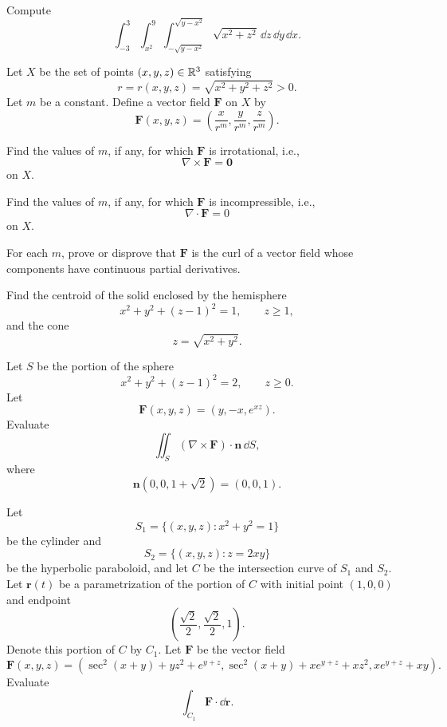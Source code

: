 \begin{problem}
Compute
\[
\int_{-3}^{3}
\int_{x^2}^{9}
\int_{-\sqrt{y-x^2}}^{\sqrt{y-x^2}}
\sqrt{x^2+z^2}\,\dd z\,\dd y\,\dd x.
\]
\end{problem}

\begin{problem}
Let $X$ be the set of points $(x,y,z)\in\mathbb{R}^3$ satisfying
\[
r=r(x,y,z)=\sqrt{x^2+y^2+z^2}>0.
\]
Let $m$ be a constant. Define a vector field $\mathbf F$ on $X$ by
\[
\mathbf F(x,y,z)
=
\left(\frac{x}{r^m},\frac{y}{r^m},\frac{z}{r^m}\right).
\]
\begin{problemsubparts}
\item Find the values of $m$, if any, for which $\mathbf F$ is irrotational, i.e.,
\[
\nabla\times\mathbf F=\mathbf0
\]
on $X$.
\item Find the values of $m$, if any, for which $\mathbf F$ is incompressible, i.e.,
\[
\nabla\cdot\mathbf F=0
\]
on $X$.
\item For each $m$, prove or disprove that $\mathbf F$ is the curl of a vector field whose components have continuous partial derivatives.
\end{problemsubparts}
\end{problem}

\begin{problem}
Find the centroid of the solid enclosed by the hemisphere
\[
x^2+y^2+(z-1)^2=1,
\qquad
z\ge1,
\]
and the cone
\[
z=\sqrt{x^2+y^2}.
\]
\end{problem}

\begin{problem}
Let $S$ be the portion of the sphere
\[
x^2+y^2+(z-1)^2=2,
\qquad
z\ge0.
\]
Let
\[
\mathbf F(x,y,z)=(y,-x,e^{xz}).
\]
Evaluate
\[
\iint_S(\nabla\times\mathbf F)\cdot\mathbf n\,\dd S,
\]
where
\[
\mathbf n(0,0,1+\sqrt2)=(0,0,1).
\]
\end{problem}

\begin{problem}
Let
\[
S_1=\{(x,y,z):x^2+y^2=1\}
\]
be the cylinder and
\[
S_2=\{(x,y,z):z=2xy\}
\]
be the hyperbolic paraboloid, and let $C$ be the intersection curve of $S_1$ and $S_2$. Let $\mathbf r(t)$ be a parametrization of the portion of $C$ with initial point $(1,0,0)$ and endpoint
\[
\left(\frac{\sqrt2}{2},\frac{\sqrt2}{2},1\right).
\]
Denote this portion of $C$ by $C_1$. Let $\mathbf F$ be the vector field
\[
\mathbf F(x,y,z)
=
\left(
\sec^2(x+y)+yz^2+e^{y+z},
\sec^2(x+y)+xe^{y+z}+xz^2,
xe^{y+z}+xy
\right).
\]
Evaluate
\[
\int_{C_1}\mathbf F\cdot\dd\mathbf r.
\]
\end{problem}

